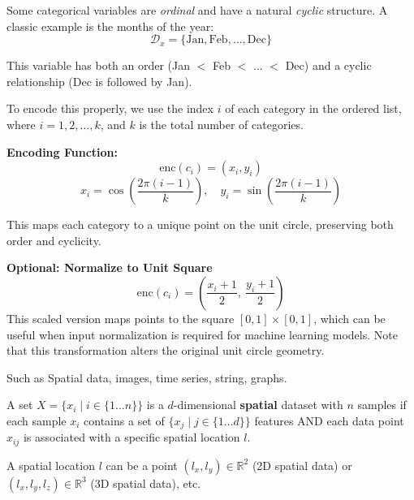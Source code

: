 \documentclass{article}
\begin{document}

Some categorical variables are \textit{ordinal} and have a natural \textit{cyclic} structure. A classic example is the months of the year:
\[
\mathcal{D}_x = \{\text{Jan}, \text{Feb}, \dots, \text{Dec}\}
\]

This variable has both an order (Jan $<$ Feb $<$ ... $<$ Dec) and a cyclic relationship (Dec is followed by Jan).

To encode this properly, we use the index \( i \) of each category in the ordered list, where \( i = 1, 2, \dots, k \), and \( k \) is the total number of categories.

\textbf{Encoding Function:}
\[
\text{enc}(c_i) = (x_i, y_i)
\]
\[
x_i = \cos\left(\frac{2\pi(i-1)}{k}\right),\quad y_i = \sin\left(\frac{2\pi(i-1)}{k}\right)
\]

This maps each category to a unique point on the unit circle, preserving both order and cyclicity.

\textbf{Optional: Normalize to Unit Square}
\[
\text{enc}(c_i) = \left(\frac{x_i + 1}{2},\ \frac{y_i + 1}{2}\right)
\]
This scaled version maps points to the square $[0, 1] \times [0, 1]$, which can be useful when input normalization is required for machine learning models. Note that this transformation alters the original unit circle geometry.


Such as Spatial data, images, time series, string, graphs.

A set $X = \{x_i \mid i \in \{1 \dots n\}\}$ is a $d$-dimensional \textbf{spatial} dataset with $n$ samples if each sample $x_i$ contains a set of $\{ x_j \mid j \in \{ 1 \dots d\} \}$  features AND each data point $x_{ij}$ is associated with a specific spatial location $l$.

A spatial location $l$ can be a point $(l_x, l_y) \in \mathbb{R}^2$ (2D spatial data) or $(l_x, l_y, l_z) \in \mathbb{R}^3$ (3D spatial data), etc.
\end{document}
